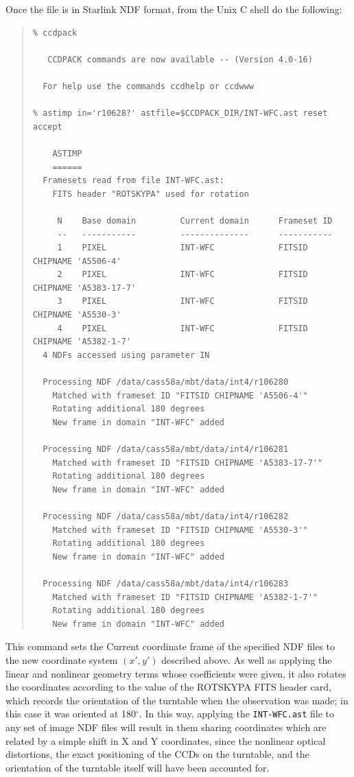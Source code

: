 \documentclass[11pt]{article}
\newenvironment{squote}{\begin{quote}\small}{\end{quote}}
\begin{document}
Once the file is in Starlink NDF format,
from the Unix C shell do the following:
\begin{squote}
\begin{verbatim}
% ccdpack 

   CCDPACK commands are now available -- (Version 4.0-16)
   
  For help use the commands ccdhelp or ccdwww

% astimp in='r10628?' astfile=$CCDPACK_DIR/INT-WFC.ast reset accept

    ASTIMP
    ======
  Framesets read from file INT-WFC.ast:
    FITS header "ROTSKYPA" used for rotation

     N    Base domain         Current domain      Frameset ID
     --   -----------         --------------      -----------
     1    PIXEL               INT-WFC             FITSID CHIPNAME 'A5506-4'
     2    PIXEL               INT-WFC             FITSID CHIPNAME 'A5383-17-7'
     3    PIXEL               INT-WFC             FITSID CHIPNAME 'A5530-3'
     4    PIXEL               INT-WFC             FITSID CHIPNAME 'A5382-1-7'
  4 NDFs accessed using parameter IN

  Processing NDF /data/cass58a/mbt/data/int4/r106280
    Matched with frameset ID "FITSID CHIPNAME 'A5506-4'"
    Rotating additional 180 degrees
    New frame in domain "INT-WFC" added

  Processing NDF /data/cass58a/mbt/data/int4/r106281
    Matched with frameset ID "FITSID CHIPNAME 'A5383-17-7'"
    Rotating additional 180 degrees
    New frame in domain "INT-WFC" added

  Processing NDF /data/cass58a/mbt/data/int4/r106282
    Matched with frameset ID "FITSID CHIPNAME 'A5530-3'"
    Rotating additional 180 degrees
    New frame in domain "INT-WFC" added

  Processing NDF /data/cass58a/mbt/data/int4/r106283
    Matched with frameset ID "FITSID CHIPNAME 'A5382-1-7'"
    Rotating additional 180 degrees
    New frame in domain "INT-WFC" added
\end{verbatim}
\end{squote}
This command sets the Current coordinate frame of the specified 
NDF files to the new coordinate system $(x',y')$ described above.
As well as applying the linear and nonlinear geometry terms whose
coefficients were given,
it also rotates the coordinates according to the value of the
ROTSKYPA FITS header card, which records the orientation of the
turntable when the observation was made;
in this case it was oriented at 180$^\circ$.
In this way, applying the {\tt INT-WFC.ast} file to any set of 
image NDF files will result in them sharing coordinates which 
are related by a simple shift in X and Y coordinates, 
since the nonlinear optical distortions, 
the exact positioning of the CCDs on the turntable,
and the orientation of the turntable itself will have been
accounted for. 
\end{document}
